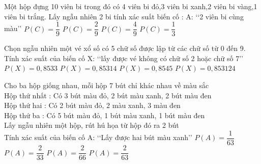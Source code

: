 \begin{ex}
Một hộp đựng 10 viên bi trong đó có 4 viên bi đỏ,3 viên bi xanh,2 viên bi vàng,1 viên bi trắng. Lấy ngẫu nhiên 2 bi tính xác suất biến cố : A: \lq\lq  2 viên bi cùng màu\rq\rq 
\choice
{$P(C)=\dfrac{1}{9}$}
{\True $P(C)=\dfrac{2}{9}$}
{$P(C)=\dfrac{4}{9}$}
{$P(C)=\dfrac{1}{3}$}
\end{ex}
\begin{ex}
Chọn ngẫu nhiên một vé xổ số có 5 chữ số được lập từ các chữ số từ 0 đến 9. Tính xác suất của biến cố X: \lq\lq  lấy được vé không có chữ số 2 hoặc chữ số 7\rq\rq 
\choice
{\True $P(X)=0{,}8533$}
{$P(X)=0{,}85314$}
{$P(X)=0{,}8545$}
{$P(X)=0{,}853124$}
\end{ex}
\begin{ex}
Cho ba hộp giống nhau, mỗi hộp 7 bút chỉ khác nhau về màu sắc\\
Hộp thứ nhất : Có 3 bút màu đỏ, 2 bút màu xanh, 2 bút màu đen\\
Hộp thứ hai : Có 2 bút màu đỏ, 2 màu xanh, 3 màu đen\\
Hộp thứ ba : Có 5 bút màu đỏ, 1 bút màu xanh, 1 bút màu đen\\
Lấy ngẫu nhiên một hộp, rút hú họa từ hộp đó ra 2 bút\\
Tính xác suất của biến cố A: \lq\lq  Lấy được hai bút màu xanh\rq\rq 
\choice
{$P(A)=\dfrac{1}{63}$}
{$P(A)=\dfrac{2}{33}$}
{\True $P(A)=\dfrac{2}{66}$}
{$P(A)=\dfrac{2}{63}$}
\end{ex}
